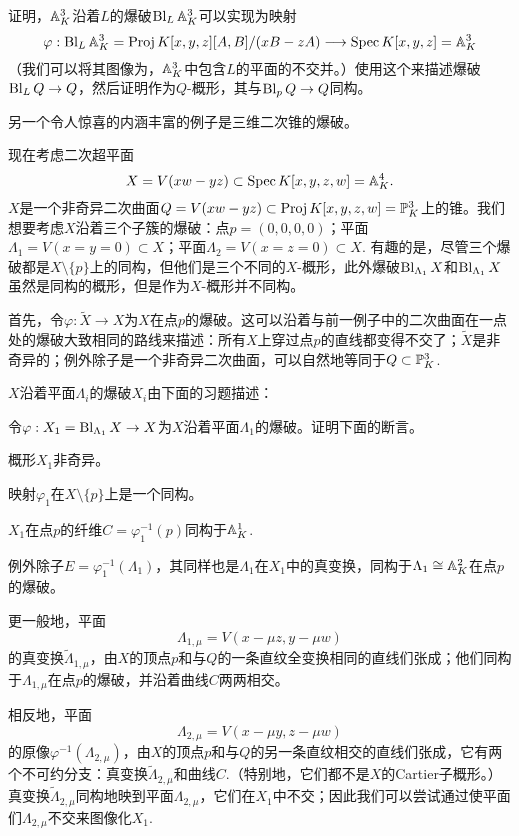 \begin{exe}\label{exe:4.28}
	证明，$\mathbb{A}^3_K$沿着$L$的爆破$\operatorname{Bl}_L\mathbb{A}_K^3$可以实现为映射
	\[
		\varphi:\operatorname{Bl}_L \mathbb A_K^3=\operatorname{Proj} K[x,y,z][A,B]/(xB-zA)\longrightarrow \operatorname{Spec} K[x,y,z]=\mathbb A_K^3
	\]
	（我们可以将其图像为，$\mathbb{A}_K^3$中包含$L$的平面的不交并。）使用这个来描述爆破$\operatorname{Bl}_L Q\to Q$，然后证明作为$Q$-概形，其与$\operatorname{Bl}_p Q\to Q$同构。
\end{exe}

另一个令人惊喜的内涵丰富的例子是三维二次锥的爆破。

\begin{exa}\label{exa:4.29}
	现在考虑二次超平面
	\[
	X=V(xw-yz)\subset \operatorname{Spec} K[x,y,z,w]=\mathbb A_K^4.
	\]
	$X$是一个非奇异二次曲面$Q=V(xw-yz)\subset \operatorname{Proj} K[x,y,z,w]=\mathbb{P}_K^3$上的锥。我们想要考虑$X$沿着三个子簇的爆破：点$p=(0,0,0,0)$；平面$\Lambda_1=V(x=y=0)\subset X$；平面$\Lambda_2=V(x=z=0)\subset X$. 有趣的是，尽管三个爆破都是$X\setminus \{p\}$上的同构，但他们是三个不同的$X$-概形，此外爆破$\operatorname{Bl}_{\Lambda_1}X$和$\operatorname{Bl}_{\Lambda_1}X$虽然是同构的概形，但是作为$X$-概形并不同构。
\end{exa}

首先，令$\varphi:\tilde X\to X$为$X$在点$p$的爆破。这可以沿着与前一例子中的二次曲面在一点处的爆破大致相同的路线来描述：所有$X$上穿过点$p$的直线都变得不交了；$\tilde X$是非奇异的；例外除子是一个非奇异二次曲面，可以自然地等同于$Q\subset \mathbb{P}_K^3$.

$X$沿着平面$\Lambda_i$的爆破$X_i$由下面的习题描述：

\begin{exe}\label{exe:4.30}
	令$\varphi:X_1=\operatorname{Bl}_{\Lambda_1}X\to X$为$X$沿着平面$\Lambda_1$的爆破。证明下面的断言。
	\begin{compactenum}[(a)]
		\item 概形$X_1$非奇异。
		\item 映射$\varphi_1$在$X\setminus \{p\}$上是一个同构。
		\item $X_1$在点$p$的纤维$C=\varphi_1^{-1}(p)$同构于$\mathbb{A}_K^1$.
		\item 例外除子$E=\varphi_1^{-1}(\Lambda_1)$，其同样也是$\Lambda_1$在$X_1$中的真变换，同构于$\Lambda_1\cong \mathbb{A}_K^2$在点$p$的爆破。
		\item 更一般地，平面
			\[
				\Lambda_{1,\mu}=V(x-\mu z,y-\mu w)
			\]
			的真变换$\tilde \Lambda_{1,\mu}$，由$X$的顶点$p$和与$Q$的一条直纹全变换相同的直线们张成；他们同构于$\Lambda_{1,\mu}$在点$p$的爆破，并沿着曲线$C$两两相交。
		\item 相反地，平面
			\[
				\Lambda_{2,\mu}=V(x-\mu y,z-\mu w)
			\]
			的原像$\varphi^{-1}(\Lambda_{2,\mu})$，由$X$的顶点$p$和与$Q$的另一条直纹相交的直线们张成，它有两个不可约分支：真变换$\tilde \Lambda_{2,\mu}$和曲线$C$.（特别地，它们都不是$X$的Cartier子概形。）真变换$\tilde \Lambda_{2,\mu}$同构地映到平面$\Lambda_{2,\mu}$，它们在$X_1$中不交；因此我们可以尝试通过使平面们$\Lambda_{2,\mu}$不交来图像化$X_1$. 

	\end{compactenum}
\end{exe}

